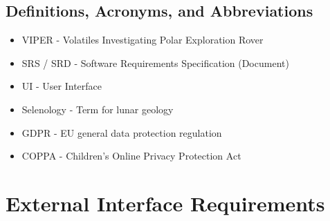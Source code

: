 \documentclass{article}
\begin{document}
\subsection{Definitions, Acronyms, and Abbreviations}
\begin{itemize}
	\item VIPER - Volatiles Investigating Polar Exploration Rover
	\item SRS / SRD - Software Requirements Specification (Document)
	\item UI - User Interface
	\item Selenology - Term for lunar geology
	\item GDPR - EU general data protection regulation
	\item COPPA - Children's Online Privacy Protection Act
\end{itemize}

\section{External Interface Requirements}
\end{document}
